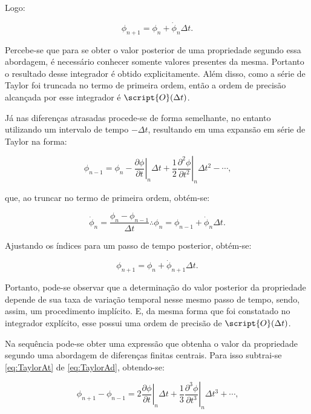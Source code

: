 \documentclass[_ArquivoPrincipal.tex]{subfiles}
\begin{document}
\noindent Logo:

\begin{equation}
    \phi_{n+1}=\phi_n+\dot{\phi}_n\Delta t\text{.}
\end{equation}

Percebe-se que para se obter o valor posterior de uma propriedade segundo essa abordagem, é necessário conhecer somente valores presentes da mesma. Portanto o resultado desse integrador é obtido explicitamente. Além disso, como a série de Taylor foi truncada no termo de primeira ordem, então a ordem de precisão alcançada por esse integrador é $\script{O}(\Delta t)$.

Já nas diferenças atrasadas procede-se de forma semelhante, no entanto utilizando um intervalo de tempo $-\Delta t$, resultando em uma expansão em série de Taylor na forma:

\begin{equation}
    \phi_{n-1}=\phi_n-\left.\frac{\partial\phi}{\partial t}\right|_n\Delta t+\frac{1}{2}\left.\frac{\partial^2\phi}{\partial t^2}\right|_n\Delta t^2-\cdots\text{,}\label{eq:TaylorAt}
\end{equation}

\noindent que, ao truncar no termo de primeira ordem, obtém-se:

\begin{equation}
    \dot{\phi}_n=\frac{\phi_n-\phi_{n-1}}{\Delta t}\therefore
    \phi_n=\phi_{n-1}+\dot{\phi}_n\Delta t\text{.}
\end{equation}

\noindent Ajustando os índices para um passo de tempo posterior, obtém-se:

\begin{equation}
    \phi_{n+1}=\phi_n+\dot{\phi}_{n+1}\Delta t\text{.}
\end{equation}

Portanto, pode-se observar que a determinação do valor posterior da propriedade depende de sua taxa de variação temporal nesse mesmo passo de tempo, sendo, assim, um procedimento implícito. E, da mesma forma que foi constatado no integrador explícito, esse possui uma ordem de precisão de $\script{O}(\Delta t)$.

Na sequência pode-se obter uma expressão que obtenha o valor da propriedade segundo uma abordagem de diferenças finitas centrais. Para isso subtrai-se \ref{eq:TaylorAt} de \ref{eq:TaylorAd}, obtendo-se:

\begin{equation}
    \phi_{n+1}-\phi_{n-1}=2\left.\frac{\partial\phi}{\partial t}\right|_n\Delta t+\frac{1}{3}\left.\frac{\partial^3\phi}{\partial t^3}\right|_n\Delta t^3+\cdots\text{,}\label{eq:TaylorCen}
\end{equation}
\end{document}
